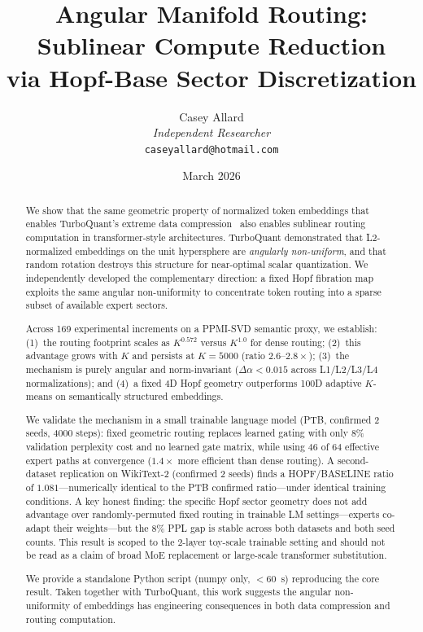 \documentclass[11pt]{article}
\title{%
  \textbf{Angular Manifold Routing: Sublinear Compute Reduction\\
  via Hopf-Base Sector Discretization}
}
\author{%
  Casey Allard\\[2pt]
  \textit{Independent Researcher}\\[2pt]
  \small\texttt{caseyallard@hotmail.com}
}
\date{March 2026}
\begin{document}
\maketitle

\begin{abstract}
We show that the same geometric property of normalized token embeddings that enables
TurboQuant's extreme data compression~\citep{turboquant2026} also enables sublinear
routing computation in transformer-style architectures.
TurboQuant demonstrated that L2-normalized embeddings on the unit hypersphere are
\emph{angularly non-uniform}, and that random rotation destroys this structure for
near-optimal scalar quantization.
We independently developed the complementary direction: a fixed Hopf fibration map
exploits the same angular non-uniformity to concentrate token routing into a sparse
subset of available expert sectors.

Across 169 experimental increments on a PPMI-SVD semantic proxy, we establish:
(1)~the routing footprint scales as $K^{0.572}$ versus $K^{1.0}$ for dense routing;
(2)~this advantage grows with $K$ and persists at $K{=}5000$ (ratio $2.6$--$2.8\times$);
(3)~the mechanism is purely angular and norm-invariant ($\Delta\alpha < 0.015$ across
L1/L2/L3/L4 normalizations);
and (4)~a fixed 4D Hopf geometry outperforms 100D adaptive $K$-means on semantically
structured embeddings.

We validate the mechanism in a small trainable language model (PTB, confirmed 2 seeds,
4000 steps): fixed geometric routing replaces learned gating with only 8\% validation
perplexity cost and no learned gate matrix, while using 46 of 64 effective expert paths at
convergence ($1.4\times$ more efficient than dense routing).
A second-dataset replication on WikiText-2 (confirmed 2 seeds) finds a
HOPF/BASELINE ratio of $1.081$---numerically identical to the PTB confirmed ratio---under identical
training conditions.
A key honest finding: the specific Hopf sector geometry does not add advantage over
randomly-permuted fixed routing in trainable LM settings---experts co-adapt their
weights---but the 8\% PPL gap is stable across both datasets and both seed counts.
This result is scoped to the 2-layer toy-scale trainable setting and should not be
read as a claim of broad MoE replacement or large-scale transformer substitution.

We provide a standalone Python script (numpy only, $<60$~s) reproducing the core result.
Taken together with TurboQuant, this work suggests the angular non-uniformity of
embeddings has engineering consequences in both data compression and routing computation.
\end{abstract}
\end{document}
